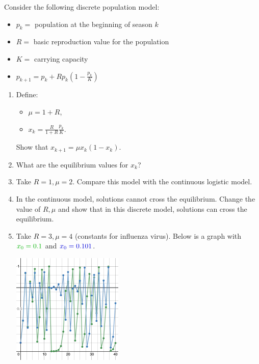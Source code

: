 \newpage 

\begin{exercises}

		\begin{problist}
	
	\prob Consider the following discrete population model:
	\begin{itemize}
		\item $p_k=$ population at the beginning of season $k$
		\item $R = $ basic reproduction value for the population
		\item $K= $ carrying capacity 
		\item $\displaystyle p_{k+1}=p_k + R p_k\left(1-\frac{p_k}{K}\right)$
	\end{itemize}
	
	\begin{enumerate}
		\item Define:
		\begin{itemize}
			\item $\mu = 1+R$,
			\item $\displaystyle x_k = \frac{R}{1+R} \frac{p_k}{K}$.
		\end{itemize}
		Show that $x_{k+1} = \mu x_k (1-x_k)$.
		\item What are the equilibrium values for $x_k$?
	
		\item Take $R=1, \mu=2$. Compare this model with the continuous logistic model.
		\item In the continuous model, solutions cannot cross the equilibrium. 
		Change the value of $R,\mu$ and show that in this discrete model, solutions can cross the equilibrium.
		
		\item Take $R=3, \mu=4$ (constants for influenza virus). Below is a graph with $\color{green!70!black}x_0 = 0.1$ and $\color{blue!85!black}x_0=0.101$.
	
			\begin{center}
				\includegraphics*[width=150pt]{images/module26-logistic.png}
			\end{center}
		

\end{enumerate}
\end{problist}
\end{exercises}
